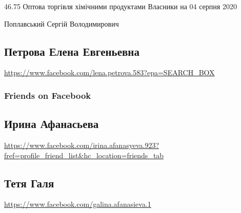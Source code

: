 46.75 Оптова торгівля хімічними продуктами
Власники на 04 серпня 2020

Поплавський Сергій Володимирович

\subsection{Петрова Елена Евгеньевна}
\url{https://www.facebook.com/lena.petrova.583?epa=SEARCH_BOX}

\subsubsection{Friends on Facebook}

\subsection{Ирина Афанасьева}
\url{https://www.facebook.com/irina.afanasyeva.923?fref=profile_friend_list&hc_location=friends_tab}

\subsection{Тетя Галя}
\url{https://www.facebook.com/galina.afanasieva.1}
  
